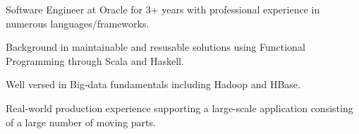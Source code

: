 

\begin{cvparagraph}


Software Engineer at Oracle for 3+ years with professional experience in numerous languages/frameworks.

Background in maintainable and resusable solutions using Functional Programming through Scala and Haskell.

Well versed in Big-data fundamentals including Hadoop and HBase.

Real-world production experience supporting a large-scale application consisting of a large number of moving parts.


\end{cvparagraph}
